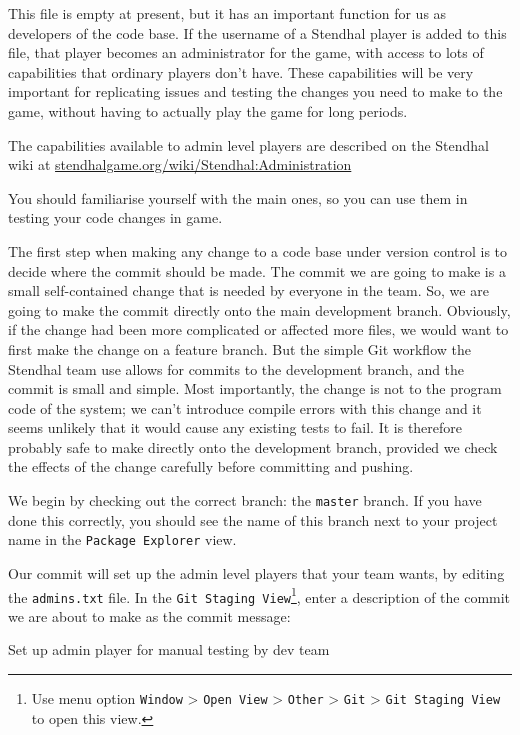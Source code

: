 \documentclass[
]{book}
\newenvironment{Shaded}{\begin{snugshade}}{\end{snugshade}}
\newcommand{\NormalTok}[1]{#1}
\begin{document}
This file is empty at present, but it has an important function for us as developers of the code base. If the username of a Stendhal player is added to this file, that player becomes an administrator for the game, with access to lots of capabilities that ordinary players don't have. These capabilities will be very important for replicating issues and testing the changes you need to make to the game, without having to actually play the game for long periods.

The capabilities available to admin level players are described on the Stendhal wiki at \href{https://stendhalgame.org/wiki/Stendhal:Administration}{stendhalgame.org/wiki/Stendhal:Administration}

You should familiarise yourself with the main ones, so you can use them in testing your code changes in game.

The first step when making any change to a code base under version control is to decide where the commit should be made. The commit we are going to make is a small self-contained change that is needed by everyone in the team. So, we are going to make the commit directly onto the main development branch. Obviously, if the change had been more complicated or affected more files, we would want to first make the change on a feature branch. But the simple Git workflow the Stendhal team use allows for commits to the development branch, and the commit is small and simple. Most importantly, the change is not to the program code of the system; we can't introduce compile errors with this change and it seems unlikely that it would cause any existing tests to fail. It is therefore probably safe to make directly onto the development branch, provided we check the effects of the change carefully before committing and pushing.

We begin by checking out the correct branch: the \texttt{master} branch. If you have done this correctly, you should see the name of this branch next to your project name in the \texttt{Package\ Explorer} view.

Our commit will set up the admin level players that your team wants, by editing the \texttt{admins.txt} file. In the \texttt{Git\ Staging\ View}\footnote{Use menu option \texttt{Window} \textgreater{} \texttt{Open\ View} \textgreater{} \texttt{Other} \textgreater{} \texttt{Git} \textgreater{} \texttt{Git\ Staging\ View} to open this view.}, enter a description of the commit we are about to make as the commit message:

\begin{Shaded}
\begin{Highlighting}[]
\NormalTok{Set up admin player for manual testing by dev team}
\end{Highlighting}
\end{Shaded}
\end{document}
